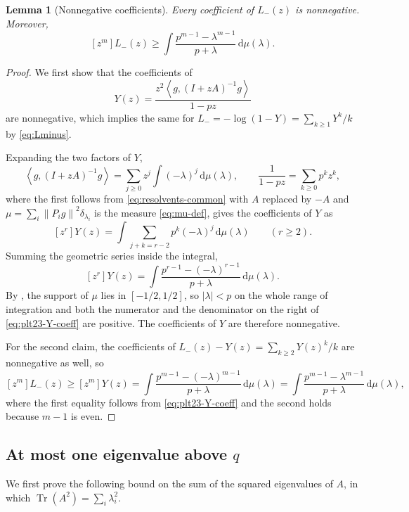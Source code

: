 ﻿\documentclass[11pt]{article}
\newtheorem{lemma}[theorem]{Lemma}
\numberwithin{equation}{section}
\newcommand{\ip}[2]{\left\langle #1,#2\right\rangle}
\newcommand{\norm}[1]{\left\lVert #1\right\rVert}
\newcommand{\Tr}{\operatorname{Tr}}
\newcommand{\dd}{\,\mathrm d}
\begin{document}
\begin{lemma}[Nonnegative coefficients]\label{lem:plt23-one-sided-identity}
  Every coefficient of $L_-(z)$ is nonnegative.
  Moreover,
  \begin{equation}\label{eq:plt23-Lminus-linear-lower}
    [z^m]L_-(z)\ge\int\frac{p^{m-1}-\lambda^{m-1}}{p+\lambda}\dd\mu(\lambda).
  \end{equation}
\end{lemma}

\begin{proof}
  We first show that the coefficients of
  \[
    Y(z)=\frac{z^2\ip g{(I+zA)^{-1}g}}{1-pz}
  \]
  are nonnegative, which implies the same for $L_-=-\log(1-Y)=\sum_{k\ge1}Y^k/k$ by \eqref{eq:Lminus}.

  Expanding the two factors of $Y$,
  \[
    \ip g{(I+zA)^{-1}g}=\sum_{j\ge0}z^j\int(-\lambda)^j\dd\mu(\lambda),
    \qquad
    \frac{1}{1-pz}=\sum_{k\ge0}p^kz^k,
  \]
  where the first follows from \eqref{eq:resolvents-common} with $A$ replaced by $-A$ and $\mu=\sum_i\norm{P_ig}^2\delta_{\lambda_i}$ is the measure \eqref{eq:mu-def}, gives the coefficients of $Y$ as
  \[
    [z^r]Y(z)
    =\int\sum_{j+k=r-2}p^k(-\lambda)^j\dd\mu(\lambda)
    \qquad(r\ge2).
  \]
  Summing the geometric series inside the integral,
  \begin{equation}\label{eq:plt23-Y-coeff}
    [z^r]Y(z)
    =\int\frac{p^{r-1}-(-\lambda)^{r-1}}{p+\lambda}\dd\mu(\lambda).
  \end{equation}
  By , the support of $\mu$ lies in $[-1/2,1/2]$, so $|\lambda|<p$ on the whole range of integration and both the numerator and the denominator on the right of \eqref{eq:plt23-Y-coeff} are positive.
  The coefficients of $Y$ are therefore nonnegative.

  For the second claim, the coefficients of $L_-(z)-Y(z)=\sum_{k\ge2}Y(z)^k/k$ are nonnegative as well, so
  \[
    [z^m]L_-(z)\ge[z^m]Y(z)
    =\int\frac{p^{m-1}-(-\lambda)^{m-1}}{p+\lambda}\dd\mu(\lambda)
    =\int\frac{p^{m-1}-\lambda^{m-1}}{p+\lambda}\dd\mu(\lambda),
  \]
  where the first equality follows from \eqref{eq:plt23-Y-coeff} and the second holds because $m-1$ is even.
\end{proof}


\subsection{At most one eigenvalue above \texorpdfstring{$q$}{q}}

We first prove the following bound on the sum of the squared eigenvalues of $A$, in which $\Tr(A^2)=\sum_i\lambda_i^2$.
\end{document}
